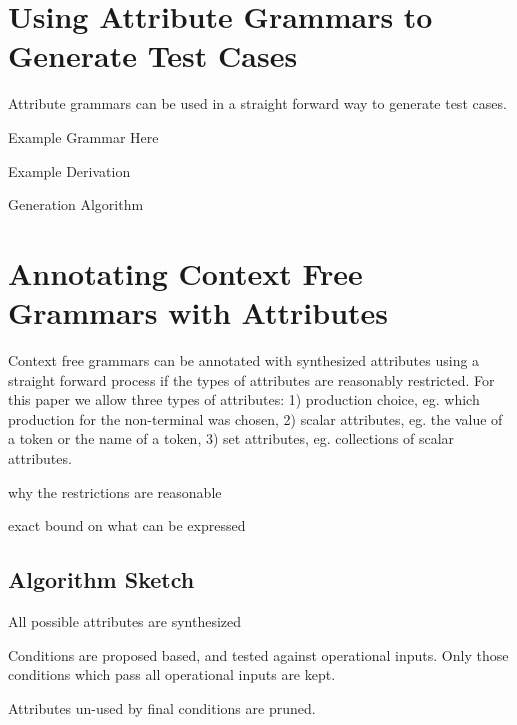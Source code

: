 
\section{Using Attribute Grammars to Generate Test Cases}

Attribute grammars can be used in a straight forward way to generate test cases. 

Example Grammar Here

Example Derivation

Generation Algorithm

\section{Annotating Context Free Grammars with Attributes}

Context free grammars can be annotated with synthesized attributes using a
straight forward process if the types of attributes are reasonably restricted.
For this paper we allow three types of attributes: 1) production choice, eg.
which production for the non-terminal was chosen, 2) scalar attributes, eg. the
value of a token or the name of a token, 3) set attributes, eg. collections of
scalar attributes. 

why the restrictions are reasonable 

exact bound on what can be expressed

\subsection{Algorithm Sketch}

All possible attributes are synthesized

Conditions are proposed based, and tested against operational inputs. Only those
conditions which pass all operational inputs are kept.

Attributes un-used by final conditions are pruned.

